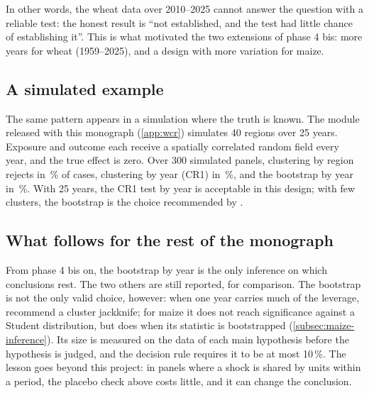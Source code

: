 \begin{table}[H]
\centering
\small
\caption{Rejection rate (\%) for wheat 2010--2025 when a true effect is added to the placebo}
\label{tab:power}

\end{table}

In other words, the wheat data over 2010--2025 cannot answer the question with a reliable test: the honest result is ``not established, and the test had little chance of establishing it''. This is what motivated the two extensions of phase 4 bis: more years for wheat (1959--2025), and a design with more variation for maize.

\subsection{A simulated example}

The same pattern appears in a simulation where the truth is known. The module released with this monograph (\cref{app:wcr}) simulates 40 regions over 25 years. Exposure and outcome each receive a spatially correlated random field every year, and the true effect is zero. Over 300 simulated panels, clustering by region rejects in \ExRegion\,\% of cases, clustering by year (CR1) in \ExCrOne\,\%, and the bootstrap by year in \ExWcr\,\%. With 25 years, the CR1 test by year is acceptable in this design; with few clusters, the bootstrap is the choice recommended by \textcite{cameron2008}.

\subsection{What follows for the rest of the monograph}

From phase 4 bis on, the bootstrap by year is the only inference on which conclusions rest. The two others are still reported, for comparison. The bootstrap is not the only valid choice, however: when one year carries much of the leverage, \textcite{mackinnon2023} recommend a cluster jackknife; for maize it does not reach significance against a Student distribution, but does when its statistic is bootstrapped (\cref{subsec:maize-inference}). Its size is measured on the data of each main hypothesis before the hypothesis is judged, and the decision rule requires it to be at most 10\,\%. The lesson goes beyond this project: in panels where a shock is shared by units within a period, the placebo check above costs little, and it can change the conclusion.
